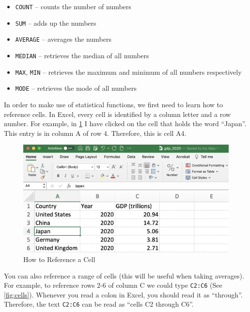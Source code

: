 \documentclass[
]{book}
\begin{document}
\begin{itemize}
\item
  \texttt{COUNT} -- counts the number of numbers
\item
  \texttt{SUM} -- adds up the numbers
\item
  \texttt{AVERAGE} -- averages the numbers
\item
  \texttt{MEDIAN} -- retrieves the median of all numbers
\item
  \texttt{MAX}, \texttt{MIN} -- retrieves the maximum and minimum of all numbers
  respectively
\item
  \texttt{MODE} -- retrieves the mode of all numbers
\end{itemize}

In order to make use of statistical functions, we first need to learn how to reference cells. In Excel, every cell is identified by a column letter and a row number. For example, in \ref{fig:japan} I have clicked on the cell that holds the word ``Japan''. This entry is in column A of row 4. Therefore, this is cell A4.

\begin{figure}

{\centering \includegraphics[width=1\linewidth]{images/01_japan} 

}

\caption{How to Reference a Cell}\label{fig:japan}
\end{figure}

You can also reference a range of cells (this will be useful when taking averages). For example, to reference rows 2-6 of column C we could type \texttt{C2:C6} (See \ref{fig:cells}). Whenever you read a colon in Excel, you should read it as ``through''. Therefore, the text \texttt{C2:C6} can be read as ``cells C2 through C6''.
\end{document}
